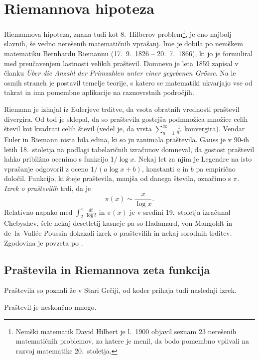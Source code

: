 \documentclass[mat1]{fmfdelo}
\begin{document}
\section{Riemannova hipoteza}

Riemannova hipoteza, znana tudi kot 8.~Hilberov problem\footnote{Nemški matematik David Hilbert je l.~1900 objavil seznam 23 nerešenih matematičnih problemov, za katere je menil, da bodo pomembno vplivali na razvoj matematike 20.~stoletja.}, je eno najbolj slavnih, še vedno nerešenih matematičnih vprašanj. Ime je dobila po nemškem matematiku Bernhardu Riemannu (17.\ 9.\ 1826 -- 20.\ 7.\ 1866), ki jo je formuliral med preučavenjem lastnosti velikih praštevil. Domnevo je leta 1859 zapisal v članku \emph{\"Uber die Anzahl der Primzahlen unter einer gegebenen Gr\"osse}. Na le osmih straneh je postavil temelje teorije, s katero se matematiki ukvarjajo vse od takrat in ima pomembne aplikacije na raznovrstnih področjih. 

Riemann je izhajal iz Eulerjeve trditve, da vsota obratnih vrednosti praštevil divergira. Od tod je sklepal, da so praštevila gostejša podmnožica množice celih števil kot kvadrati celih števil (vedel je, da vrsta $\sum_{n=1}^{\infty} \frac{1}{n^2}$ konvergira).
Vendar Euler in Riemann nista bila edina, ki so ju zanimala praštevila. Gauss je v 90-ih letih 18.~stoletja na podlagi tabelaričnih izračunov domneval, da gostost praštevil lahko približno ocenimo s funkcijo $1/ \log{x}$. Nekaj let za njim je Legendre na isto vprašanje odgovoril z oceno $1/ (a\log{x}+b)$, konstanti $a$ in $b$ pa empirično določil. 
Funkcijo, ki šteje praštevila, manjša od danega števila, označimo s $\pi$. \emph{Izrek o praštevilih} trdi, da je
\begin{equation}
\pi(x) \sim \frac{x}{\log{x}}.
\end{equation}
%
Relativno napako med $\int_{2}^x \frac{dt}{\log{t}}$ in $\pi(x)$ je v sredini 19.~stoletja izračunal Chebyshev, šele nekaj desetletij kasneje pa so Hadamard, von Mangoldt in de~la~Vall\'ee Poussin dokazali izrek o praštevilih in nekaj sorodnih trditev. Zgodovina je povzeta po \cite[poglavje 1.1]{zetafunction}.
%
\subsection{Praštevila in Riemannova zeta funkcija}

Praštevila so poznali že v Stari Grčiji, od koder prihaja tudi naslednji izrek.
\begin{izrek}[Evklid]
Praštevil je neskončno mnogo.
\end{izrek}
\end{document}
